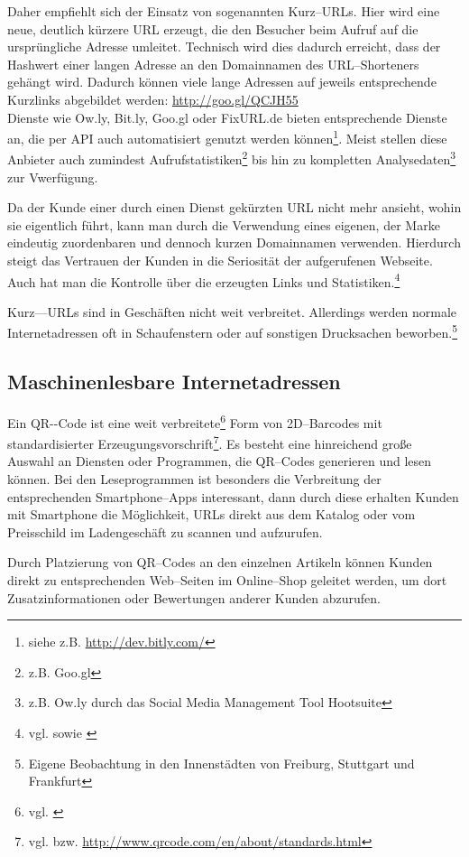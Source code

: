 Daher empfiehlt sich der Einsatz von sogenannten Kurz--URLs. Hier wird eine neue, deutlich kürzere \ac{URL} erzeugt, die den Besucher beim Aufruf auf die ursprüngliche Adresse umleitet. Technisch wird dies dadurch erreicht, dass der Hashwert einer langen Adresse an den Domainnamen des URL--Shorteners gehängt wird. Dadurch können viele lange Adressen auf jeweils
entsprechende Kurzlinks abgebildet werden: \url{http://goo.gl/QCJH55}\\
Dienste wie Ow.ly, Bit.ly, Goo.gl oder FixURL.de bieten entsprechende Dienste an, die per \ac{API} auch automatisiert genutzt werden können\footnote{siehe z.B. \url{http://dev.bitly.com/}}. Meist stellen diese Anbieter auch zumindest Aufrufstatistiken\footnote{z.B. Goo.gl} bis hin zu kompletten Analysedaten\footnote{z.B. Ow.ly durch das Social Media Management Tool Hootsuite} zur Vwerfügung.

Da der Kunde einer durch einen Dienst gekürzten \ac{URL} nicht mehr ansieht, wohin sie eigentlich führt, kann man durch die Verwendung eines eigenen, der Marke eindeutig zuordenbaren und dennoch kurzen Domainnamen verwenden. Hierdurch steigt das Vertrauen der Kunden in die Seriosität der aufgerufenen Webseite. Auch hat man die Kontrolle über die erzeugten Links und Statistiken.\footnote{vgl. \cite{webmag} sowie \cite{gillen}}

Kurz––URLs sind in Geschäften nicht weit verbreitet. Allerdings werden normale Internetadressen oft in Schaufenstern oder auf sonstigen Drucksachen beworben.\footnote{Eigene Beobachtung in den Innenstädten von Freiburg, Stuttgart und Frankfurt}

\subsection{Maschinenlesbare Internetadressen}

Ein \ac{QR--Code} ist eine weit verbreitete\footnote{vgl. \cite{statista:qr}} Form von 2D--Barcodes mit standardisierter Erzeugungsvorschrift\footnote{vgl. \cite{iso:qr} bzw. \url{http://www.qrcode.com/en/about/standards.html}}. Es besteht eine hinreichend große Auswahl an Diensten oder Programmen, die QR--Codes generieren und lesen können. Bei den Leseprogrammen ist besonders die Verbreitung der entsprechenden Smartphone--Apps interessant, dann durch diese erhalten Kunden mit Smartphone die Möglichkeit, \ac{URL}s direkt aus dem Katalog oder vom Preisschild im Ladengeschäft zu scannen und aufzurufen. 

Durch Platzierung von QR--Codes an den einzelnen Artikeln können Kunden direkt zu entsprechenden Web--Seiten im Online--Shop geleitet werden, um dort Zusatzinformationen oder Bewertungen anderer Kunden abzurufen. 

